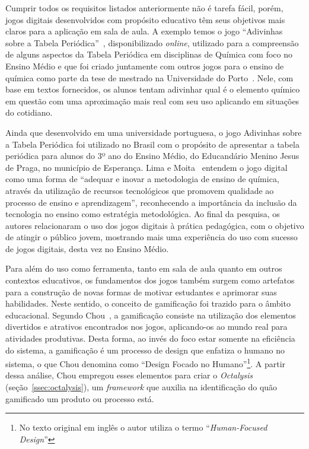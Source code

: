 Cumprir todos os requisitos listados anteriormente não é tarefa fácil, porém, jogos digitais desenvolvidos com propósito educativo têm seus objetivos mais claros para a aplicação em sala de aula. A exemplo temos o jogo “Adivinhas sobre a Tabela Periódica”~\cite{ramos_adivinhas_2004}, disponibilizado \textit{online}, utilizado para a compreensão de alguns aspectos da Tabela Periódica em disciplinas de Química com foco no Ensino Médio e que foi criado juntamente com outros jogos para o ensino de química como parte da tese de mestrado na Universidade do Porto~\cite{ramos_utilizacao_2004}. Nele, com base em textos fornecidos, os alunos tentam adivinhar qual é o elemento químico em questão com uma aproximação mais real com seu uso aplicando em situações do cotidiano.

Ainda que desenvolvido em uma universidade portuguesa, o jogo Adivinhas sobre a Tabela Periódica foi utilizado no Brasil com o propósito de apresentar a tabela periódica para alunos do 3º ano do Ensino Médio, do Educandário Menino Jesus de Praga, no município de Esperança. Lima e Moita~\cite[~p. 142]{lima_tecnologia_2011} entendem o jogo digital como uma forma de “adequar e inovar a metodologia de ensino de química, através da utilização de recursos tecnológicos que promovem qualidade ao processo de ensino e aprendizagem”, reconhecendo a importância da inclusão da tecnologia no ensino como estratégia metodológica. Ao final da pesquisa, os autores relacionaram o uso dos jogos digitais à prática pedagógica, com o objetivo de atingir o público jovem, mostrando mais uma experiência do uso com sucesso de jogos digitais, desta vez no Ensino Médio.

Para além do uso como ferramenta, tanto em sala de aula quanto em outros contextos educativos, os fundamentos dos jogos também surgem como artefatos para a construção de novas formas de motivar estudantes e aprimorar suas habilidades. Neste sentido, o conceito de gamificação foi trazido para o âmbito educacional. Segundo Chou~\cite{chou_what_2017}, a gamificação consiste na utilização dos elementos divertidos e atrativos encontrados nos jogos, aplicando-os ao mundo real para atividades produtivas. Desta forma, ao invés do foco estar somente na eficiência do sistema, a gamificação é um processo de design que enfatiza o humano no sistema, o que Chou denomina como “Design Focado no Humano”\footnote{No texto original em inglês o autor utiliza o termo “\textit{Human-Focused Design}”}.  A partir dessa análise, Chou empregou esses elementos para criar o \textit{Octalysis} (seção~\ref{ssec:octalysis}), um \textit{framework} que auxilia na identificação do quão gamificado um produto ou processo está.

